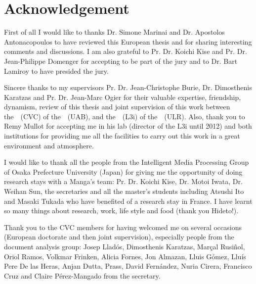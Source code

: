 \chapter*{Acknowledgement}

First of all I would like to thanks Dr. Simone Marinai and Dr. Apostolos Antonacopoulos to have reviewed this European thesis and for sharing interesting comments and discussions.
I am also grateful to Pr. Dr. Koichi Kise and Pr. Dr. Jean-Philippe Domenger for accepting to be part of the jury and to Dr. Bart Lamiroy to have presided the jury.

Sincere thanks to my supervisors Pr. Dr. Jean-Christophe Burie, Dr. Dimosthenis Karatzas and Pr. Dr. Jean-Marc Ogier for their valuable expertise, friendship, dynamism, review of this thesis and joint supervision of this work between the~\CVC~(CVC) of the~\UAB~(UAB), and the~\LIII~(L3i) of the~\ULR~(ULR).
Also, thank you to Remy Mullot for accepting me in his lab (director of the L3i until 2012) and both institutions for providing me all the facilities to carry out this work in a great environment and atmosphere.

I would like to thank all the people from the Intelligent Media Processing Group of Osaka Prefecture University (Japan) for giving me the opportunity of doing research stays with a Manga's team: Pr. Dr. Koichi Kise, Dr. Motoi Iwata, Dr. Weihan Sun, the secretaries and all the master's students including Atsushi Ito and Masaki Tukada who have benefited of a research stay in France.
I have learnt so many things about research, work, life style and food (thank you Hideto!).

Thank you to the CVC members for having welcomed me on several occasions (European doctorate and then joint supervision), especially people from the document analysis group: Josep Llad\'{o}s, Dimosthenis Karatzas, Marçal Rusiñol, Oriol Ramos, Volkmar Frinken, Alicia Fornes, Jon Almazan, Lluis G\'{o}mez, Llu\'{i}s Pere De las Heras, Anjan Dutta, Prass, David Fern\'{a}ndez, Nuria Cirera, Francisco Cruz and Claire Pérez-Mangado from the secretary.
\\

